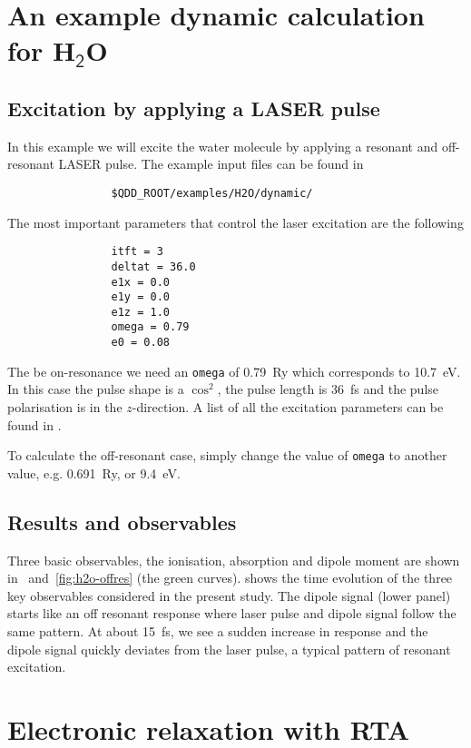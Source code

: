 \documentclass[11pt,a4paper]{article}
\begin{document}
	\section{An example dynamic calculation for H$_\mathsf{2}$O}

		\subsection{Excitation by applying a LASER pulse}
			In this example we will excite the water molecule by applying a resonant and off-resonant LASER pulse. The example input files can be found in
			\begin{verbatim}
				$QDD_ROOT/examples/H2O/dynamic/
			\end{verbatim}
			The most important parameters that control the laser excitation are the following		
			\begin{verbatim}
				itft = 3
				deltat = 36.0
				e1x = 0.0
				e1y = 0.0
				e1z = 1.0
				omega = 0.79
				e0 = 0.08
			\end{verbatim}
			The be on-resonance we need an \texttt{omega} of 0.79~Ry which corresponds to 10.7~eV. In this case the pulse shape is a $\cos^2$, the pulse length is 36~fs and the pulse polarisation is in the $z$-direction. A list of all the excitation parameters can be found in .
			
			To calculate the off-resonant case, simply change the value of \texttt{omega} to another value, e.g. 0.691~Ry, or 9.4~eV.
		
		\subsection{Results and observables}	
			Three basic observables, the ionisation, absorption and dipole moment are shown in ~and~\ref{fig:h2o-offres} (the green curves).  shows the time evolution of the three key observables considered in the present study. The dipole signal (lower panel) starts like an off resonant response where laser pulse and dipole signal follow the same pattern. At about 15~fs, we see a sudden increase in response and the dipole signal quickly deviates from the laser pulse, a typical pattern of resonant excitation.
	
	\section{Electronic relaxation with RTA}
	
\end{document}
